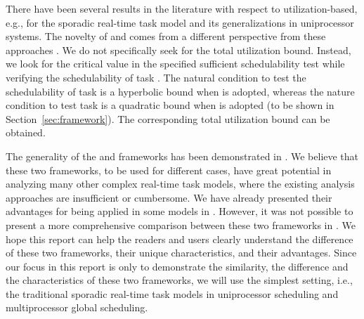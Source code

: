 \documentclass[10pt,conference]{IEEEtran}
\newcommand{\frameworkkq}[1]{}
\newcommand{\frameworkku}[1]{}
\begin{document}
There have been several results in the literature with respect to
utilization-based, e.g.,
\cite{liu1973scheduling,HanTyan-RTSS97,journals/tc/LeeSP04,DBLP:conf/rtas/WuLZ05,kuo2003efficient}
for the sporadic real-time task model and its generalizations in uniprocessor systems.
The novelty of \frameworkku{} and \frameworkkq{} comes from a different
perspective from these approaches
\cite{liu1973scheduling,HanTyan-RTSS97,journals/tc/LeeSP04,DBLP:conf/rtas/WuLZ05,kuo2003efficient}. We
do not specifically seek for the total utilization bound. Instead, we
look for the critical value in the specified sufficient schedulability
test while verifying the schedulability of task . 
The natural condition to test
the schedulability of task  is a hyperbolic bound when
\frameworkku{} is adopted, whereas the nature condition to
test task  is a quadratic bound when \frameworkkq{} is adopted
(to be shown in Section~\ref{sec:framework}). The corresponding total
utilization bound can be obtained.

The generality of the \frameworkkq{} and \frameworkku{} frameworks has
been demonstrated in
\cite{DBLP:journals/corr/abs-1501.07084,DBLP:conf/rtss/ChenHL15,DBLP:journals/corr/abs-kRTA,DBLP:conf/rtss/ChenHL16}.
We believe that these two frameworks, to be used for different cases,
have great potential in analyzing many other complex real-time task
models, where the existing analysis approaches are insufficient or
cumbersome.  We have already presented their advantages for being
applied in some models in
\cite{DBLP:journals/corr/abs-1501.07084,DBLP:conf/rtss/ChenHL15,DBLP:journals/corr/abs-kRTA,DBLP:conf/rtss/ChenHL16}.
However, it was not possible to present a more comprehensive
comparison between these two frameworks in \cite{DBLP:journals/corr/abs-1501.07084,DBLP:conf/rtss/ChenHL15,DBLP:journals/corr/abs-kRTA,DBLP:conf/rtss/ChenHL16}. We hope this report can help
the readers and users clearly understand the difference of these
two frameworks, their unique characteristics, and their advantages.
Since our focus in this report is only to demonstrate the similarity,
the difference
and the characteristics of these two frameworks, we will use 
the simplest setting, i.e., the traditional sporadic real-time task
models in uniprocessor scheduling and multiprocessor global
scheduling.
\end{document}
